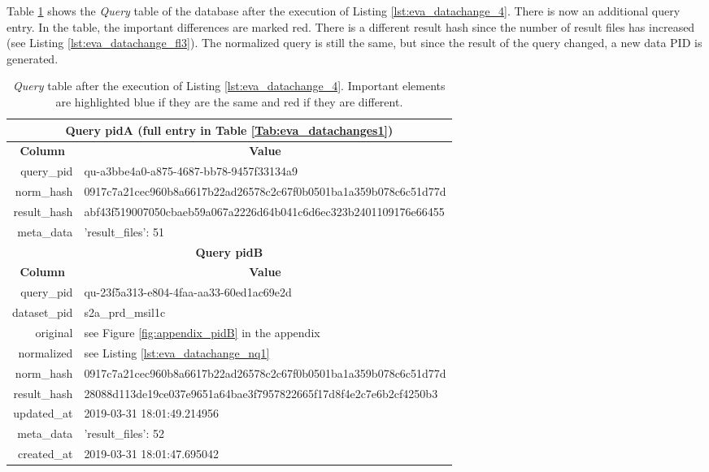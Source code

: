 \documentclass[draft,final]{vutinfth} %
\begin{document}
\begin{enumerate}
	Table \ref{Tab:eva_datachanges3} shows the \textit{Query} table of the database after the execution of Listing \ref{lst:eva_datachange_4}. There is now an additional query entry. In the table, the important differences are marked red. There is a different result hash since the number of result files has increased (see Listing \ref{lst:eva_datachange_fl3}). The normalized query is still the same, but since the result of the query changed, a new data PID is generated. 
	
	\begin{table}[]
		\caption{\textit{Query} table after the execution of Listing \ref{lst:eva_datachange_4}. Important elements are highlighted blue if they are the same and red if they are different.}
		\centering
		\begin{tabular}{|r|l|}
			\hline \multicolumn{2}{|c|}{\textbf{Query pidA (full entry in Table \ref{Tab:eva_datachanges1})}} \\
			\hline \multicolumn{1}{|c|}{\textbf{Column}}  &  \multicolumn{1}{c|}{\textbf{Value}} \\ \hline
			query\_pid & {\color{red}qu-a3bbe4a0-a875-4687-bb78-9457f33134a9}  \\ 
			norm\_hash & {\color{blue}0917c7a21cec960b8a6617b22ad26578c2c67f0b0501ba1a359b078c6c51d77d}  \\
			result\_hash & {\color{red}abf43f519007050cbaeb59a067a2226d64b041c6d6ec323b2401109176e66455}   \\
			meta\_data & {'result\_files': 51}  \\
			\hline \multicolumn{2}{|c|}{\textbf{Query pidB}} \\
			\hline \multicolumn{1}{|c|}{\textbf{Column}}  &  \multicolumn{1}{c|}{\textbf{Value}} \\ \hline
			query\_pid & { \color{red} qu-23f5a313-e804-4faa-aa33-60ed1ac69e2d}  \\ 
			dataset\_pid & s2a\_prd\_msil1c  \\ 
			original & see Figure \ref{fig:appendix_pidB} in the appendix \\
			normalized & see Listing \ref{lst:eva_datachange_nq1}  \\
			norm\_hash & {\color{blue}0917c7a21cec960b8a6617b22ad26578c2c67f0b0501ba1a359b078c6c51d77d}  \\
			result\_hash & {\color{red}28088d113de19ce037e9651a64bae3f7957822665f17d8f4e2c7e6b2cf4250b3 }  \\
			updated\_at & 2019-03-31 18:01:49.214956   \\
			meta\_data & {\color{red}'result\_files': 52}  \\
			created\_at & 2019-03-31 18:01:47.695042   \\ \hline
		\end{tabular}
		\label{Tab:eva_datachanges3}
	\end{table}
	

\end{enumerate}
\end{document}
